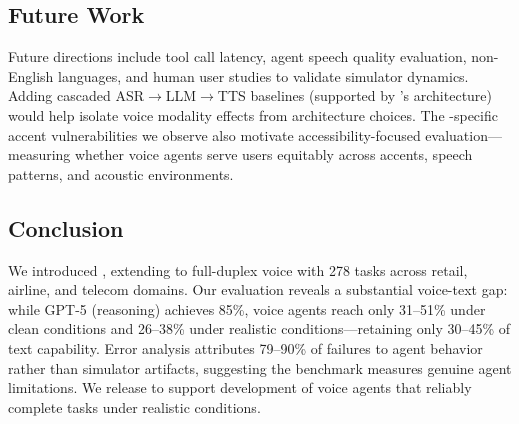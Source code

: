 \subsection{Future Work}

Future directions include tool call latency, agent speech quality evaluation, non-English languages, and human user studies to validate simulator dynamics.  Adding cascaded ASR$\rightarrow$LLM$\rightarrow$TTS baselines (supported by \tauvoice{}'s architecture) would help isolate voice modality effects from architecture choices. The -specific accent vulnerabilities we observe also motivate accessibility-focused evaluation---measuring whether voice agents serve users equitably across accents, speech patterns, and acoustic environments.

\subsection{Conclusion}

We introduced \textbf{\tauvoice{}}, extending \tautwobench{} to full-duplex voice with 278 tasks across retail, airline, and telecom domains. Our evaluation reveals a substantial voice-text gap: while GPT-5 (reasoning) achieves 85\%, voice agents reach only 31--51\% under clean conditions and 26--38\% under realistic conditions---retaining only 30--45\% of text capability. Error analysis attributes 79--90\% of failures to agent behavior rather than simulator artifacts, suggesting the benchmark measures genuine agent limitations. We release \tauvoice{} to support development of voice agents that reliably complete tasks under realistic conditions.
% 